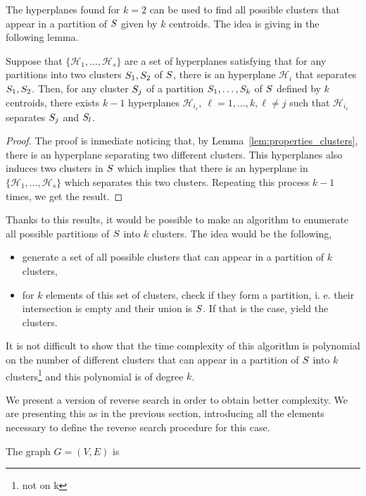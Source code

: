 \documentclass{article}
\newcommand{\cH}{\mathcal{H}}
\begin{document}
The hyperplanes found for $k=2$ can be used to find all possible
clusters that appear in a partition of $S$ given by $k$ centroids.
The idea is giving in the following lemma.
\begin{lemma}
  \label{lem:k-1-hyperplanes}
  Suppose that $\{\cH_1,\ldots, \cH_s\}$ are a set of hyperplanes
  satisfying that for any partitions  into two clusters
  $S_1,S_2$ of $S$, there is an hyperplane $\cH_i$ that
  separates $S_1,S_2$. Then, for any cluster $S_j$ of a
  partition $S_1,\ldots, S_{k}$ of $S$ defined by $k$
  centroids, there exists $k-1$ hyperplanes $\cH_{i_\ell},\ \ell = 1,\ldots,
  k, \ell\neq j$ such that $\cH_{i_{\ell}}$ separates $S_{j}$ and
  $S_{l}$. 
\end{lemma}
\begin{proof}
  The proof is inmediate noticing that, by
  Lemma~\ref{lem:properties_clusters}, there is an hyperplane
  separating two different clusters. This hyperplanes also induces two
  clusters in  $S$ which implies that there is an hyperplane in
  $\{\cH_1,\ldots, \cH_s\}$ which separates this two
  clusters. Repeating this process $k-1$ times, we get the result.
\end{proof}
Thanks to this results, it would be possible to make an algorithm to
enumerate all possible partitions of $S$ into $k$ clusters. The
idea would be the following,
\begin{itemize}
\item generate a set of all possible clusters that can appear
  in a partition of $k$ clusters,
\item for  $k$ elements of this set of clusters, check if they form a
  partition, i. e. their intersection is empty and their union is
  $S$. If that is the case, yield the clusters. 
\end{itemize}
It is not difficult to show that the time complexity of this algorithm
is polynomial on the number of different clusters that can appear
in a partition of $S$ into $k$ clusters\footnote{not on k} and this
polynomial is of degree $k$. 

We present a version of reverse search in order to obtain better
complexity. We are presenting this as in the previous section,
introducing all the elements necessary to define the reverse search
procedure for this case.

The graph $G = (V,E)$ is 



\end{document}
